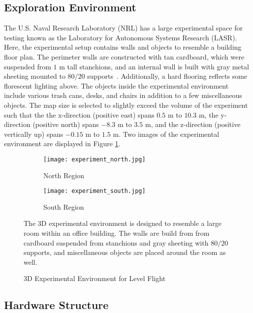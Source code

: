 \subsection{Exploration Environment}

The U.S. Naval Research Laboratory (NRL) has a large experimental space for testing known as the Laboratory for Autonomous Systems Research (LASR). Here, the experimental setup contains walls and objects to resemble a building floor plan. The perimeter walls are constructed with tan cardboard, which were suspended from $1$ m tall stanchions, and an internal wall is built with gray metal sheeting mounted to $80/20$ supports~\cite{url_8020}. Additionally, a hard flooring reflects some florescent lighting above. The objects inside the experimental environment include various trash cans, desks, and chairs in addition to a few miscellaneous objects. The map size is selected to slightly exceed the volume of the experiment such that the the x-direction (positive east) spans $0.5$ m to $10.3$ m, the y-direction (positive north) spans $-8.3$ m to $3.5$ m, and the z-direction (positive vertically up) spans $-0.15$ m to $1.5$ m. Two images of the experimental environment are displayed in Figure \ref{fig:exp3DEnvironment}.

\begin{figure}[!t]
\centering
    	\begin{subfigure}[t]{0.95\columnwidth}
           	\centering
          	\texttt{[image: experiment\_north.jpg]}
        		\caption{North Region}
    	\end{subfigure}
    	\begin{subfigure}[t]{0.95\columnwidth}
	\vspace*{0.03\columnwidth}
           	\centering
          	\texttt{[image: experiment\_south.jpg]}
        		\caption{South Region}
    	\end{subfigure}
	\caption{3D Experimental Environment for Level Flight}
	\medskip
	\small
	The 3D experimental environment is designed to resemble a large room within an office building. The walls are build from from cardboard suspended from stanchions and gray sheeting with $80/20$ supports, and miscellaneous objects are placed around the room as well.
	\label{fig:exp3DEnvironment}
\end{figure}


\subsection{Hardware Structure}

